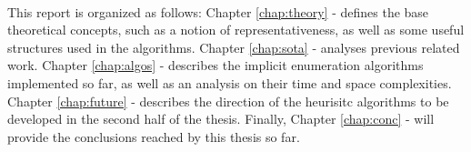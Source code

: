 \paragraph{}
This report is organized as follows:
Chapter \ref{chap:theory} -  defines the base theoretical concepts, such as a notion of representativeness, as well as some useful structures used in the algorithms. Chapter \ref{chap:sota} -  analyses previous related work. Chapter \ref{chap:algos} -  describes the implicit enumeration algorithms implemented so far, as well as an analysis on their time and space complexities. Chapter \ref{chap:future} -  describes the direction of the heurisitc algorithms to be developed in the second half of the thesis. Finally, Chapter \ref{chap:conc} -  will provide the conclusions reached by this thesis so far.